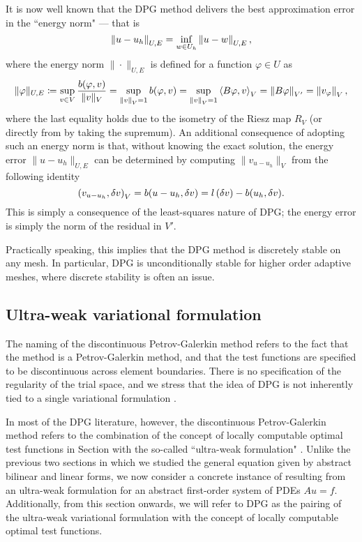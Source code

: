 It is now well known that the DPG method
delivers the best approximation error in the ``energy norm" --- that is
\cite{Bui-ThanhDemkowiczGhattas11a, DPG2,DPG4} 
\begin{equation}
\eqnlab{optimalError}
\nor{u-u_h}_{U,E} = \inf_{w\in U_h} \nor{u-w}_{U,E},
\end{equation}
where the energy norm $\|\cdot \|_{U,E}$ is defined for a function $\varphi \in U$ as
\begin{equation}
\eqnlab{energyNorm} \|\varphi\|_{U,E} \coloneqq \sup_{v\in V}
\frac{b(\varphi,v)}{\|v\|_V} = \sup_{\nor{v}_V = 1} b(\varphi,v) =
\sup_{\nor{v}_V = 1} \LRa{B\varphi,v}_V = \nor{B\varphi}_{V'} =
\nor{v_\varphi}_V,
\end{equation}
where the last equality holds due to the isometry of the Riesz map
$R_V$ (or directly from  by taking the supremum). An
additional consequence of adopting such an energy norm is that,
without knowing the exact solution, the energy error $\|u-u_h\|_{U,E}$ can
be determined by computing $\|v_{u-u_h}\|_V$ from the following
identity
\[
\left(v_{u-u_h},\delta v\right)_V = b(u-u_h,\delta v) = l\LRp{\delta
v} - b(u_h,\delta v).
\]
This is simply a consequence of the least-squares nature of DPG; the energy error is simply the norm of the  residual in $V'$. 

Practically speaking, this implies that the DPG method is discretely stable on any mesh. In particular, DPG is unconditionally stable for higher order adaptive meshes, where discrete stability is often an issue. 

\subsection{Ultra-weak variational formulation}

The naming of the discontinuous Petrov-Galerkin method refers to the fact that the method is a Petrov-Galerkin method, and that the test functions are specified to be discontinuous across element boundaries. There is no specification of the regularity of the trial space, and we stress that the idea of DPG is not inherently tied to a single variational formulation \cite{Bui-ThanhDemkowiczGhattas11a}. 

In most of the DPG literature, however, the discontinuous Petrov-Galerkin method refers to the combination of the concept of locally computable optimal test functions in Section  with the so-called ``ultra-weak formulation" \cite{DPG1,DPG2,DPG3,DPG4,DPGElas,DBLP:journals/procedia/NiemiCC11}. Unlike the previous two sections in which we studied the general equation  given by abstract bilinear and linear forms, we now consider a concrete instance of  resulting from an ultra-weak formulation for an abstract first-order system of PDEs $Au = f$. Additionally, from this section onwards, we will refer to DPG as the pairing of the ultra-weak variational formulation with the concept of locally computable optimal test functions. 

